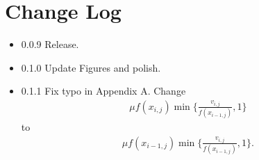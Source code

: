 \section{Change Log}
\begin{itemize}
\item{0.0.9} Release.
\item{0.1.0} Update Figures and polish.
\item{0.1.1} Fix typo in Appendix A. Change 
\begin{align*}
\mu f(x_{i,j}) \min\{\frac{v_{i,j}}{f(x_{i-1,j})},1\}
\end{align*}
\noindent to 
\begin{align*}
\mu f(x_{i-1,j}) \min\{\frac{v_{i,j}}{f(x_{i-1,j})},1\}.
\end{align*}
\end{itemize}
